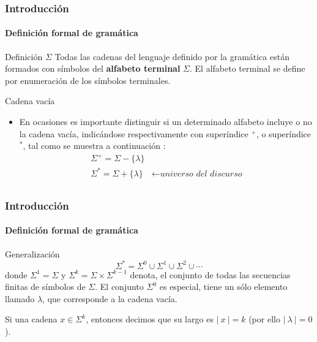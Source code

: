 \documentclass{beamer}
\begin{document}
        \begin{frame}
            \frametitle{Introducci\'on}
            \framesubtitle{Definici\'on formal de gram\'atica}

            \begin{block}{Definici\'on $\Sigma$}
                Todas las cadenas del lenguaje definido por la gram\'atica est\'an formados con s\'imbolos del \textbf{alfabeto terminal} $\Sigma$. El alfabeto terminal se define por enumeraci\'on de los s\'imbolos terminales.
			\end{block}
			\begin{block}{Cadena vac\'ia}
                \begin{itemize}
                    \item[\checkmark] En ocasiones es importante distinguir si un determinado alfabeto incluye o no la cadena vac\'ia, indic\'andose respectivamente con super\'indice $^{+}$, o super\'indice $^{*}$, tal como se muestra a continuaci\'on :
                    $$
                        \begin{array}{ll}
                            \Sigma^{+} = \Sigma - \{\lambda\} & \\
                            \Sigma^{*} = \Sigma + \{\lambda\} & \leftarrow \textit{universo del discurso} \\
                        \end{array}
                    $$
                \end{itemize}
			\end{block}
		\end{frame}

        \begin{frame}
            \frametitle{Introducci\'on}
            \framesubtitle{Definici\'on formal de gram\'atica}

            \begin{block}{Generalizaci\'on}
                $$\Sigma^{*} = \Sigma^{0} \cup \Sigma^{1} \cup \Sigma^{2} \cup \cdots$$
                donde $\Sigma^{1} = \Sigma $ y $\Sigma^{k} = \Sigma \times \Sigma^{k-1}$ denota, el conjunto de todas las secuencias finitas de s\'imbolos de $\Sigma$. El conjunto $\Sigma^{0}$ es especial, tiene un s\'olo elemento llamado $\lambda$, que corresponde a la cadena vac\'ia.
			 \end{block}
			 \begin{block}{}
                Si una cadena $x \in \Sigma^{k}$, entonces decimos que su largo es $|~x~| = k$ (por ello $|~\lambda~| = 0$). 
			 \end{block}
		\end{frame}
\end{document}
